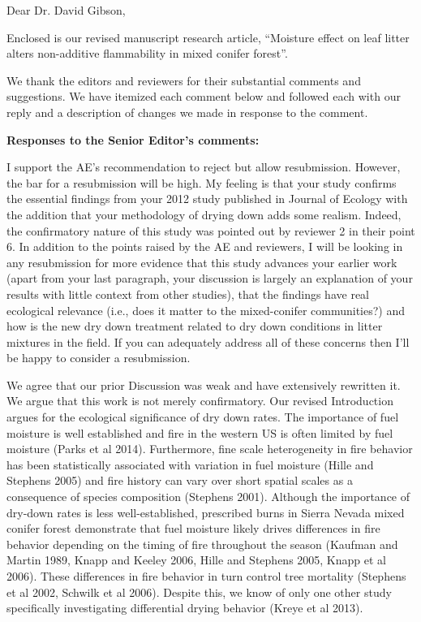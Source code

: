 \documentclass[letterpaper, 12pt]{letter}
\begin{document}
\begin{letter}{}

\opening{Dear Dr. David Gibson,}

Enclosed is our revised manuscript research article, ``Moisture effect on leaf
litter alters non-additive flammability in mixed conifer forest''.

We thank the editors and reviewers for their substantial comments and
suggestions. We have itemized each comment below and followed each with our
reply and a description of changes we made in response to the comment.

{\bf Responses to the Senior Editor's comments:}

\begin{quoting}
  I support the AE's recommendation to reject but allow resubmission. However,
  the bar for a resubmission will be high. My feeling is that your study
  confirms the essential findings from your 2012 study published in Journal of
  Ecology with the addition that your methodology of drying down adds some
  realism. Indeed, the confirmatory nature of this study was pointed out by
  reviewer 2 in their point 6. In addition to the points raised by the AE and
  reviewers, I will be looking in any resubmission for more evidence that this
  study advances your earlier work (apart from your last paragraph, your
  discussion is largely an explanation of your results with little context from
  other studies), that the findings have real ecological relevance (i.e., does
  it matter to the mixed-conifer communities?) and how is the new dry down
  treatment related to dry down conditions in litter mixtures in the field. If
  you can adequately address all of these concerns then I'll be happy to
  consider a resubmission.
\end{quoting}

We agree that our prior Discussion was weak and have extensively rewritten it.
We argue that this work is not merely confirmatory. Our revised Introduction
argues for the ecological significance of dry down rates. The importance of
fuel moisture is well established and fire in the western US is often limited
by fuel moisture (Parks et al 2014). Furthermore, fine scale heterogeneity in
fire behavior has been statistically associated with variation in fuel moisture
(Hille and Stephens 2005) and fire history can vary over short spatial scales
as a consequence of species composition (Stephens 2001). Although the
importance of dry-down rates is less well-established, prescribed burns in
Sierra Nevada mixed conifer forest demonstrate that fuel moisture likely drives
differences in fire behavior depending on the timing of fire throughout the
season (Kaufman and Martin 1989, Knapp and Keeley 2006, Hille and Stephens
2005, Knapp et al 2006). These differences in fire behavior in turn control
tree mortality (Stephens et al 2002, Schwilk et al 2006). Despite this, we know
of only one other study specifically investigating differential drying behavior
(Kreye et al 2013).


\end{letter}
\end{document}
